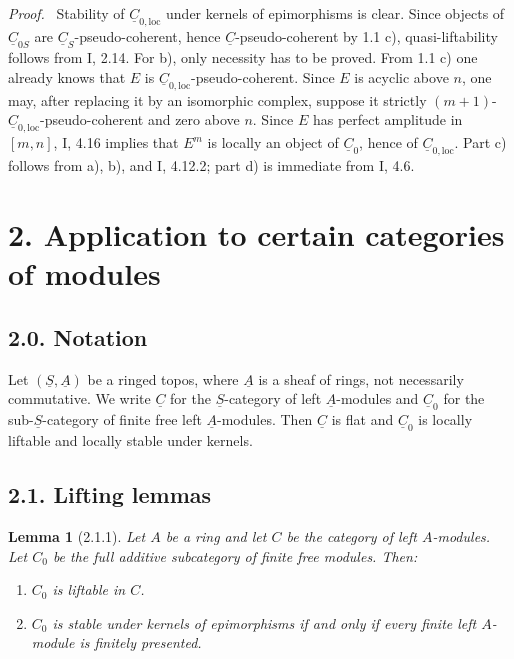 \documentclass[13pt]{extarticle}
\newcommand{\uS}{\underline S}
\newcommand{\uC}{\underline C}
\newcommand{\uA}{\underline A}
\newenvironment{prooftext}[1][Proof]{\par\noindent\emph{#1.}\ }{\par\medskip}
\newtheorem*{lemma*}{Lemma}
\begin{document}
\begin{prooftext}
Stability of $\uC_{0,\mathrm{loc}}$ under kernels of epimorphisms is clear. Since objects of $\uC_{0S}$ are $\uC_S$-pseudo-coherent, hence $\uC$-pseudo-coherent by 1.1 c), quasi-liftability follows from I, 2.14. For b), only necessity has to be proved. From 1.1 c) one already knows that $E$ is $\uC_{0,\mathrm{loc}}$-pseudo-coherent. Since $E$ is acyclic above $n$, one may, after replacing it by an isomorphic complex, suppose it strictly $(m+1)$-$\uC_{0,\mathrm{loc}}$-pseudo-coherent and zero above $n$. Since $E$ has perfect amplitude in $[m,n]$, I, 4.16 implies that $E^m$ is locally an object of $\uC_0$, hence of $\uC_{0,\mathrm{loc}}$. Part c) follows from a), b), and I, 4.12.2; part d) is immediate from I, 4.6.
\end{prooftext}

\section*{2. Application to certain categories of modules}

\subsection*{2.0. Notation}
Let $(\uS,\uA)$ be a ringed topos, where $\uA$ is a sheaf of rings, not necessarily commutative. We write $\uC$ for the $\uS$-category of left $\uA$-modules and $\uC_0$ for the sub-$\uS$-category of finite free left $\uA$-modules. Then $\uC$ is flat and $\uC_0$ is locally liftable and locally stable under kernels.

\subsection*{2.1. Lifting lemmas}
\begin{lemma*}[2.1.1]
Let $A$ be a ring and let $C$ be the category of left $A$-modules. Let $C_0$ be the full additive subcategory of finite free modules. Then:
\begin{enumerate}[label=\alph*)]
\item $C_0$ is liftable in $C$.
\item $C_0$ is stable under kernels of epimorphisms if and only if every finite left $A$-module is finitely presented.
\end{enumerate}
\end{lemma*}
\end{document}
